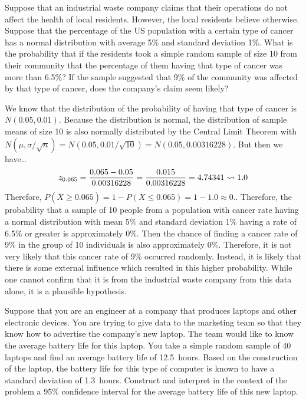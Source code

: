 \documentclass[11pt,letterpaper]{article}
\begin{document}
 Suppose that an industrial waste company claims that their operations do not affect the health of local residents. However, the local residents believe otherwise. Suppose that the percentage of the US population with a certain type of cancer has a normal distribution with average 5\% and standard deviation 1\%. What is the probability that if the residents took a simple random sample of size 10 from their community that the percentage of them having that type of cancer was more than 6.5\%? If the sample suggested that 9\% of the community was affected by that type of cancer, does the company's claim seem likely? \pspace

\sol We know that the distribution of the probability of having that type of cancer is $N(0.05, 0.01)$. Because the distribution is normal, the distribution of sample means of size 10 is also normally distributed by the Central Limit Theorem with $N(\mu, \sigma/\sqrt{n})= N(0.05, 0.01/\sqrt{10})= N(0.05, 0.00316228)$. But then we have\dots
	\[
	z_{0.065}= \dfrac{0.065 - 0.05}{0.00316228}= \dfrac{0.015}{0.00316228}= 4.74341 \rightsquigarrow 1.0
	\]
Therefore, $P(\overline{X} \geq 0.065)= 1 - P(X \leq 0.065)= 1 - 1.0 \approx 0.$. Therefore, the probability that a sample of 10 people from a population with cancer rate having a normal distribution with mean 5\% and standard deviation 1\% having a rate of 6.5\% or greater is approximately 0\%. Then the chance of finding a cancer rate of 9\% in the group of 10 individuals is also approximately 0\%. Therefore, it is not very likely that this cancer rate of 9\% occurred randomly. Instead, it is likely that there is some external influence which resulted in this higher probability. While one cannot confirm that it is from the industrial waste company from this data alone, it is a plausible hypothesis. 



\newpage



 Suppose that you are an engineer at a company that produces laptops and other electronic devices. You are trying to give data to the marketing team so that they know how to advertise the company's new laptop. The team would like to know the average battery life for this laptop. You take a simple random sample of 40 laptops and find an average battery life of 12.5~hours. Based on the construction of the laptop, the battery life for this type of computer is known to have a standard deviation of 1.3~hours. Construct and interpret in the context of the problem a 95\% confidence interval for the average battery life of this new laptop. \pspace
\end{document}
